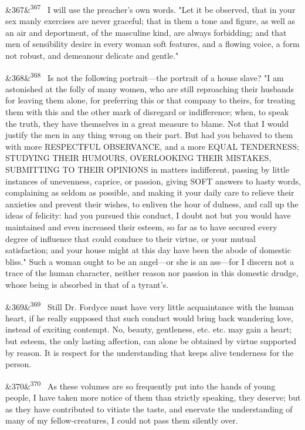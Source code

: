 \documentclass[12pt]{article}
\newcommand{\para}[1][]{\par\noindent\ifx&#1&\else\textsuperscript{\footnotesize #1}~\fi}
\begin{document}
\para[367] I will use the preacher's own words. "Let it be observed, that in your sex manly exercises are never graceful; that in them a tone and figure, as well as an air and deportment, of the masculine kind, are always forbidding; and that men of sensibility desire in every woman soft features, and a flowing voice, a form not robust, and demeanour delicate and gentle."

\para[368] Is not the following portrait---the portrait of a house slave? "I am astonished at the folly of many women, who are still reproaching their husbands for leaving them alone, for preferring this or that company to theirs, for treating them with this and the other mark of disregard or indifference; when, to speak the truth, they have themselves in a great measure to blame. Not that I would justify the men in any thing wrong on their part. But had you behaved to them with more RESPECTFUL OBSERVANCE, and a more EQUAL TENDERNESS; STUDYING THEIR HUMOURS, OVERLOOKING THEIR MISTAKES, SUBMITTING TO THEIR OPINIONS in matters indifferent, passing by little instances of unevenness, caprice, or passion, giving SOFT answers to hasty words, complaining as seldom as possible, and making it your daily care to relieve their anxieties and prevent their wishes, to enliven the hour of dulness, and call up the ideas of felicity: had you pursued this conduct, I doubt not but you would have maintained and even increased their esteem, so far as to have secured every degree of influence that could conduce to their virtue, or your mutual satisfaction; and your house might at this day have been the abode of domestic bliss." Such a woman ought to be an angel---or she is an ass---for I discern not a trace of the human character, neither reason nor passion in this domestic drudge, whose being is absorbed in that of a tyrant's.

\para[369] Still Dr. Fordyce must have very little acquaintance with the human heart, if he really supposed that such conduct would bring back wandering love, instead of exciting contempt. No, beauty, gentleness, etc. etc. may gain a heart; but esteem, the only lasting affection, can alone be obtained by virtue supported by reason. It is respect for the understanding that keeps alive tenderness for the person.

\para[370] As these volumes are so frequently put into the hands of young people, I have taken more notice of them than strictly speaking, they deserve; but as they have contributed to vitiate the taste, and enervate the understanding of many of my fellow-creatures, I could not pass them silently over.
\end{document}
